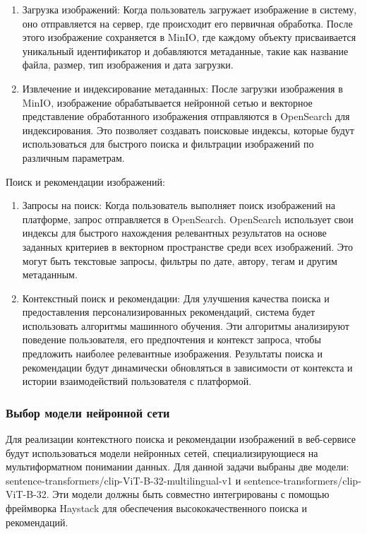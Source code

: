 \begin{enumerate}
	\item Загрузка изображений: Когда пользователь загружает изображение в систему, оно отправляется на сервер, где происходит его первичная обработка. После этого изображение сохраняется в MinIO, где каждому объекту присваивается уникальный идентификатор и добавляются метаданные, такие как название файла, размер, тип изображения и дата загрузки.
	\item Извлечение и индексирование метаданных: После загрузки изображения в MinIO, изображение обрабатывается нейронной сетью и векторное представление обработанного изображения отправляются в OpenSearch для индексирования. Это позволяет создавать поисковые индексы, которые будут использоваться для быстрого поиска и фильтрации изображений по различным параметрам.
\end{enumerate}

Поиск и рекомендации изображений:

\begin{enumerate}
	\item Запросы на поиск: Когда пользователь выполняет поиск изображений на платформе, запрос отправляется в OpenSearch. OpenSearch использует свои индексы для быстрого нахождения релевантных результатов на основе заданных критериев в векторном пространстве среди всех изображений. Это могут быть текстовые запросы, фильтры по дате, автору, тегам и другим метаданным.
	\item Контекстный поиск и рекомендации: Для улучшения качества поиска и предоставления персонализированных рекомендаций, система будет использовать алгоритмы машинного обучения. Эти алгоритмы анализируют поведение пользователя, его предпочтения и контекст запроса, чтобы предложить наиболее релевантные изображения. Результаты поиска и рекомендации будут динамически обновляться в зависимости от контекста и истории взаимодействий пользователя с платформой.
\end{enumerate}

\subsubsection{Выбор модели нейронной сети}

Для реализации контекстного поиска и рекомендации изображений в веб-сервисе будут использоваться модели нейронных сетей, специализирующиеся на мультиформатном понимании данных. Для данной задачи выбраны две модели: sentence-transformers/clip-ViT-B-32-multilingual-v1 и sentence-transformers/clip-ViT-B-32. Эти модели должны быть совместно интегрированы с помощью фреймворка Haystack для обеспечения высококачественного поиска и рекомендаций.

